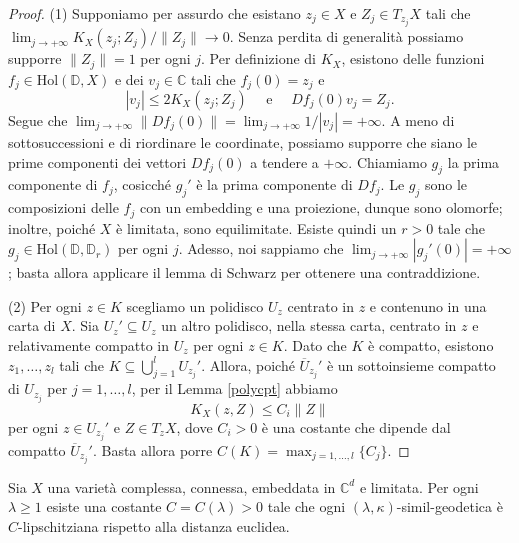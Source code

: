 \begin{proof}
    (1) Supponiamo per assurdo che esistano $z_j \in X$ e $Z_j \in T_{z_j}X$ tali che $\displaystyle \lim_{j \longrightarrow +\infty} K_X(z_j;Z_j)/\|Z_j\| \longrightarrow 0$. Senza perdita di generalità possiamo supporre $\|Z_j\|=1$ per ogni $j$. Per definizione di $K_X$, esistono delle funzioni $f_j\in\text{Hol}(\mathbb{D},X)$ e dei $v_j \in \mathbb{C}$ tali che $f_j(0)=z_j$ e
    $$|v_j| \le 2K_X(z_j;Z_j)\quad\text{ e }\quad Df_j(0)v_j=Z_j.$$
    Segue che $\displaystyle \lim_{j \longrightarrow +\infty}\|Df_j(0)\|=\lim_{j \longrightarrow +\infty}1/|v_j|=+\infty$. A meno di sottosuccessioni e di riordinare le coordinate, possiamo supporre che siano le prime componenti dei vettori $Df_j(0)$ a tendere a $+\infty$. Chiamiamo $g_j$ la prima componente di $f_j$, cosicché $g_j'$ è la prima componente di $Df_j$. Le $g_j$ sono le composizioni delle $f_j$ con un embedding e una proiezione, dunque sono olomorfe; inoltre, poiché $X$ è limitata, sono equilimitate. Esiste quindi un $r>0$ tale che $g_j \in \text{Hol}(\mathbb{D},\mathbb{D}_r)$ per ogni $j$. Adesso, noi sappiamo che $\displaystyle\lim_{j\longrightarrow +\infty} |g_j'(0)|=+\infty$; basta allora applicare il lemma di Schwarz per ottenere una contraddizione.

    (2) Per ogni $z \in K$ scegliamo un polidisco $U_z$ centrato in $z$ e contenuno in una carta di $X$. Sia $U_z'\subseteq U_z$ un altro polidisco, nella stessa carta, centrato in $z$ e relativamente compatto in $U_z$ per ogni $z \in K$. Dato che $K$ è compatto, esistono $z_1,\dots,z_l$ tali che $K\subseteq\displaystyle\bigcup_{j=1}^l U_{z_j}'$. Allora, poiché $\overline{U}_{z_j}'$ è un sottoinsieme compatto di $U_{z_j}$ per $j=1,\dots,l$, per il Lemma \ref{polycpt} abbiamo
    $$K_X(z,Z) \le C_i\|Z\|$$
    per ogni $z \in U_{z_j}'$ e $Z\in T_zX$, dove $C_i>0$ è una costante che dipende dal compatto $\overline{U}_{z_j}'$. Basta allora porre $C(K)=\displaystyle\max_{j=1,\dots,l}\{C_j\}$.
\end{proof}

\begin{prop} \label{simillip}
    Sia $X$ una varietà complessa, connessa, embeddata in $\mathbb{C}^d$ e limitata. Per ogni $\lambda \ge 1$ esiste una costante $C=C(\lambda)>0$ tale che ogni $(\lambda,\kappa)$-simil-geodetica è $C$-lipschitziana rispetto alla distanza euclidea.
\end{prop}

